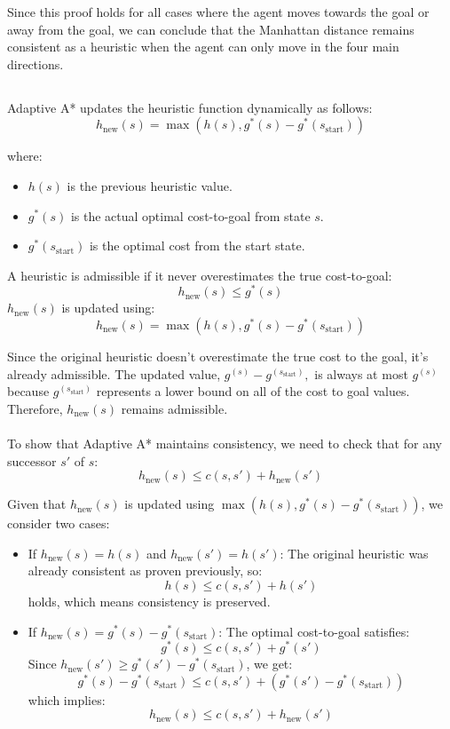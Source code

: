 \documentclass{article}
\begin{document}
Since this proof holds for all cases where the agent moves towards the goal or away from the goal, we can conclude that the Manhattan distance remains consistent as a heuristic when the agent can only move in the four main directions.

\subsection{}

Adaptive A* updates the heuristic function dynamically as follows:
    \[ h_{\text{new}}(s) = \max(h(s), g^*(s) - g^*(s_{\text{start}})) \]

where:
\begin{itemize}
    \item $h(s)$ is the previous heuristic value.
    \item $g^*(s)$ is the actual optimal cost-to-goal from state $s$.
    \item $g^*(s_{\text{start}})$ is the optimal cost from the start state.
\end{itemize}

A heuristic is admissible if it never overestimates the true cost-to-goal:
    \[h_{\text{new}}(s) \leq g^*(s)\]
$h_{\text{new}}(s)$ is updated using:
    \[h_{\text{new}}(s) = \max(h(s), g^*(s) - g^*(s_{\text{start}}))\]

Since the original heuristic doesn't overestimate the true cost to the goal, it's already admissible. The updated value,  $g^(s) - g^(s_{\text{start}}),$  is always at most  $g^(s)$  because  $g^(s_{\text{start}})$  represents a lower bound on all of the cost to goal values. Therefore,  $h_{\text{new}}(s)$  remains admissible.

\paragraph{}
To show that Adaptive A* maintains consistency, we need to check that for any successor $s'$ of $s$:
    \[h_{\text{new}}(s) \leq c(s, s') + h_{\text{new}}(s')\]

Given that $h_{\text{new}}(s)$ is updated using $\max(h(s), g^*(s) - g^*(s_{\text{start}}))$, we consider two cases:

\begin{itemize}
    \item If $h_{\text{new}}(s) = h(s)$ and $h_{\text{new}}(s') = h(s')$:
    The original heuristic was already consistent as proven previously, so:
    \[h(s) \leq c(s, s') + h(s')\]
    holds, which means consistency is preserved.

    \item If $h_{\text{new}}(s) = g^*(s) - g^*(s_{\text{start}})$:
    The optimal cost-to-goal satisfies:
    \[g^*(s) \leq c(s, s') + g^*(s')\]
    Since $h_{\text{new}}(s') \geq g^*(s') - g^*(s_{\text{start}})$, we get:
    \[g^*(s) - g^*(s_{\text{start}}) \leq c(s, s') + (g^*(s') - g^*(s_{\text{start}}))\]
    which implies:
    \[h_{\text{new}}(s) \leq c(s, s') + h_{\text{new}}(s')\]
\end{itemize}
\end{document}
